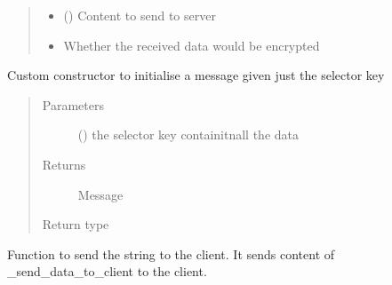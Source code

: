 \documentclass[letterpaper,10pt,english]{sphinxmanual}
\begin{document}
\begin{fulllineitems}
\begin{quote}
\begin{description}
\begin{itemize}
\item {} 
 () \textendash{} Content to send to server

\item {} 
 \textendash{} Whether the received data would be encrypted

\end{itemize}

\end{description}\end{quote}

\begin{fulllineitems}
\label{\detokenize{Message:Message.Message.fromSelKey}}
Custom constructor to initialise a message given just the selector key
\begin{quote}\begin{description}
\item[{Parameters}] \leavevmode
{} () \textendash{} the selector key containitnall the data

\item[{Returns}] \leavevmode
Message

\item[{Return type}] \leavevmode
{\hyperref[\detokenize{Message:Message.Message}]{}}

\end{description}\end{quote}

\end{fulllineitems}


\begin{fulllineitems}
\label{\detokenize{Message:Message.Message._send_data_to_client}}
Function to send the string to the client. It sends content of \_send\_data\_to\_client to the client.


\end{fulllineitems}
\end{fulllineitems}
\end{document}
